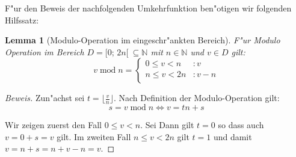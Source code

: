 \documentclass[a4paper]{article}
\renewcommand{\mod}{\;\mathrm{mod}\;}
\numberwithin{equation}{section}
\newtheorem{lmm}{Lemma}
\begin{document}
F"ur den Beweis der nachfolgenden Umkehrfunktion ben"otigen wir folgenden
Hilfssatz:
\begin{lmm}[Modulo-Operation im eingeschr"ankten Bereich]\label{lmm:modulo}
  F"ur Modulo Operation im Bereich $D = [0;\,2n[\ \subseteq \mathbb{N}$ mit
  $n \in \mathbb{N}$ und $v \in D$ gilt:
  \begin{equation}
    v \mod n = \left\{\begin{array}{ll}
        0 \le v < n & : v \\
        n \le v < 2n & : v - n \\
      \end{array}\right.
  \end{equation}
\end{lmm}
\begin{proof}[Beweis]
  Zun"achst sei $t = \lfloor\frac{v}{n}\rfloor$. Nach Definition der
  Modulo-Operation gilt:
  \begin{equation}s = v \mod n \Longleftrightarrow v = tn + s\end{equation}

  \noindent Wir zeigen zuerst den Fall $0 \le v < n$. Sei Dann gilt $t = 0$ so
  dass auch $v = 0 + s = v$ gilt. Im zweiten Fall $n \le v < 2n$ gilt $t = 1$
  und damit $v = n + s = n + v - n = v$.
\end{proof}
\end{document}
